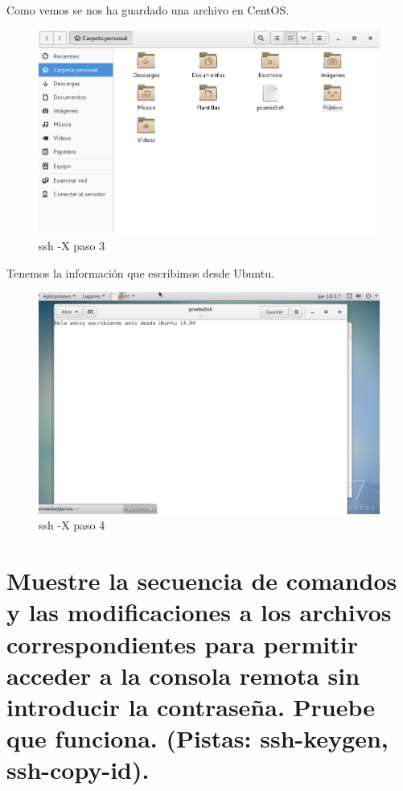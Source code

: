 \begin{enumerate}[label=(\alph*)]
	Como vemos se nos ha guardado una archivo en CentOS.
	\begin{figure}[H]
	\centering
	\includegraphics[scale=0.35]{pics/ssh_3.png}  
	\caption{ssh -X paso 3} \label{fig:ssh_3}
	\end{figure}

	Tenemos la información que escribimos desde Ubuntu.
	\begin{figure}[H]
		\centering
		\includegraphics[scale=0.35]{pics/ssh_4.png}  
		\caption{ssh -X paso 4} \label{fig:ssh_4}
	\end{figure}

	
	
\end{enumerate}

\section[Cuestión 6]{ Muestre la secuencia de comandos y las modificaciones a los	archivos correspondientes para permitir acceder a la consola remota sin introducir la contraseña. Pruebe que funciona. (Pistas: ssh-keygen, ssh-copy-id).}

